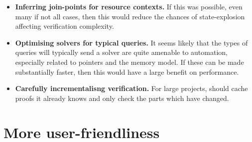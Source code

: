 \begin{itemize}
    \item \textbf{Inferring join-points for resource contexts.} If this
        was possible, even many if not all cases, then this would
        reduce the chances of state-explosion affecting verification
        complexity.
    \item \textbf{Optimising solvers for typical queries.} It seems
        likely that the types of queries  will typically send a
        solver are quite amenable to automation, especially related
        to pointers and the  memory model. If these can be
        made substantially faster, then this would have a large
        benefit on  performance.
    \item \textbf{Carefully incrementalisng verification.} For large projects,
         should cache proofs it already knows and only check the parts
        which have changed.
\end{itemize}

\section{More user-friendliness}

